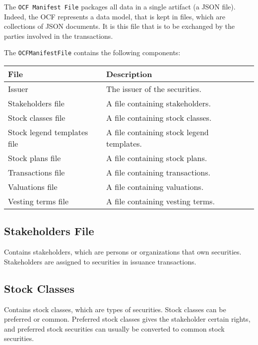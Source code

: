 The \texttt{OCF Manifest File} packages all data in a single artifact (a JSON file). Indeed, the OCF represents a data model, that is kept in files, which are collections of JSON documents. It is this file that is to be exchanged by the parties involved in the transactions.

The \texttt{OCFManifestFile} contains the following components:

\begin{tabular}{|l|l|l|}
    \hline
    \textbf{File}               & \textbf{Description}                      \\ \hline
    Issuer                      & The issuer of the securities.             \\ \hline
    Stakeholders file           & A file containing stakeholders.           \\ \hline
    Stock classes file          & A file containing stock classes.          \\ \hline
    Stock legend templates file & A file containing stock legend templates. \\ \hline
    Stock plans file            & A file containing stock plans.            \\ \hline
    Transactions file           & A file containing transactions.           \\ \hline
    Valuations file             & A file containing valuations.             \\ \hline
    Vesting terms file          & A file containing vesting terms.          \\ \hline
\end{tabular}

\subsection{Stakeholders File}

Contains stakeholders, which are persons or organizations that own securities. Stakeholders are assigned to securities in issuance transactions.

\subsection{Stock Classes}

Contains stock classes, which are types of securities. Stock classes can be preferred or common. Preferred stock classes gives the stakeholder certain rights, and preferred stock securities can usually be converted to common stock securities.


